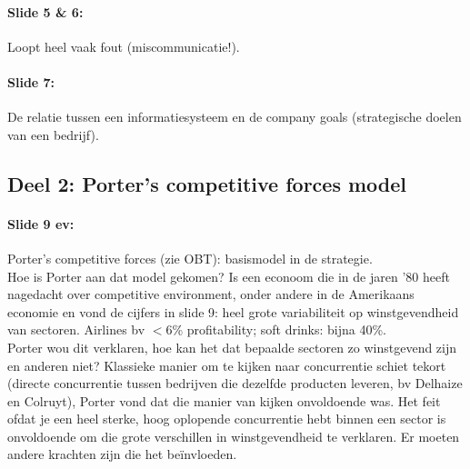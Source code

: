 \documentclass[10pt,a4paper]{report}
\begin{document}
\paragraph{Slide 5 \& 6:}Loopt heel vaak fout (miscommunicatie!).

\paragraph{Slide 7:}De relatie tussen een informatiesysteem en de company goals (strategische doelen van een bedrijf).

\subsection{Deel 2: Porter's competitive forces model}
\paragraph{Slide 9 ev:}Porter's competitive forces (zie OBT): basismodel in de strategie.\\
Hoe is Porter aan dat model gekomen? Is een econoom die in de jaren '80 heeft nagedacht over competitive environment, onder andere in de Amerikaans economie en vond de cijfers in slide 9: heel grote variabiliteit op winstgevendheid van sectoren. Airlines bv $<$6\% profitability; soft drinks: bijna 40\%.\\
Porter wou dit verklaren, hoe kan het dat bepaalde sectoren zo winstgevend zijn en anderen niet? Klassieke manier om te kijken naar concurrentie schiet tekort (directe concurrentie tussen bedrijven die dezelfde producten leveren, bv Delhaize en Colruyt), Porter vond dat die manier van kijken onvoldoende was. Het feit ofdat je een heel sterke, hoog oplopende concurrentie hebt binnen een sector is onvoldoende om die grote verschillen in winstgevendheid te verklaren. Er moeten andere krachten zijn die het beïnvloeden.\\
\end{document}

